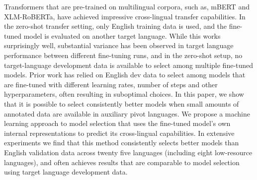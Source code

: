Transformers that are pre-trained on multilingual corpora, such as, mBERT and XLM-RoBERTa, have achieved impressive cross-lingual transfer capabilities.  In the zero-shot transfer setting, only English training data is used, and the fine-tuned model is evaluated on another target language. While this works surprisingly well, substantial variance has been observed in target language performance between different fine-tuning runs, and in the zero-shot setup, no target-language development data is available to select among multiple fine-tuned models. Prior work has relied on English dev data to select among models that are fine-tuned with different learning rates, number of steps and other hyperparameters, often resulting in suboptimal choices.  In this paper, we show that it is possible to select consistently better models when small amounts of annotated data are available in auxiliary pivot languages. We propose a machine learning approach to model selection that uses the fine-tuned model's own internal representations to predict its cross-lingual capabilities.  In extensive experiments we find that this method consistently selects better models than English validation data across twenty five languages (including eight low-resource languages), and often achieves results that are comparable to model selection using target language development data.
